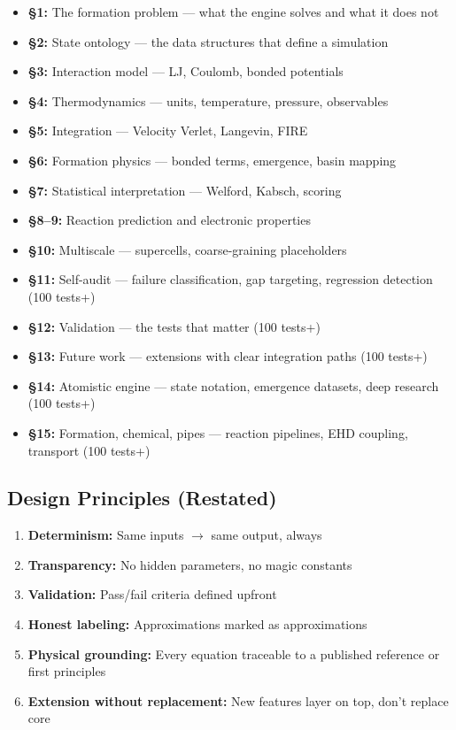 \documentclass[11pt]{article}
\begin{document}
\begin{itemize}
\item \textbf{§1:} The formation problem — what the engine solves and what it does not
\item \textbf{§2:} State ontology — the data structures that define a simulation
\item \textbf{§3:} Interaction model — LJ, Coulomb, bonded potentials
\item \textbf{§4:} Thermodynamics — units, temperature, pressure, observables
\item \textbf{§5:} Integration — Velocity Verlet, Langevin, FIRE
\item \textbf{§6:} Formation physics — bonded terms, emergence, basin mapping
\item \textbf{§7:} Statistical interpretation — Welford, Kabsch, scoring
\item \textbf{§8--9:} Reaction prediction and electronic properties
\item \textbf{§10:} Multiscale — supercells, coarse-graining placeholders
\item \textbf{§11:} Self-audit — failure classification, gap targeting, regression detection (100 tests+)
\item \textbf{§12:} Validation — the tests that matter (100 tests+)
\item \textbf{§13:} Future work — extensions with clear integration paths (100 tests+)
\item \textbf{§14:} Atomistic engine — state notation, emergence datasets, deep research (100 tests+)
\item \textbf{§15:} Formation, chemical, pipes — reaction pipelines, EHD coupling, transport (100 tests+)
\end{itemize}

\subsection{Design Principles (Restated)}

\begin{enumerate}
\item \textbf{Determinism:} Same inputs $\to$ same output, always
\item \textbf{Transparency:} No hidden parameters, no magic constants
\item \textbf{Validation:} Pass/fail criteria defined upfront
\item \textbf{Honest labeling:} Approximations marked as approximations
\item \textbf{Physical grounding:} Every equation traceable to a published reference or first principles
\item \textbf{Extension without replacement:} New features layer on top, don't replace core
\end{enumerate}
\end{document}
